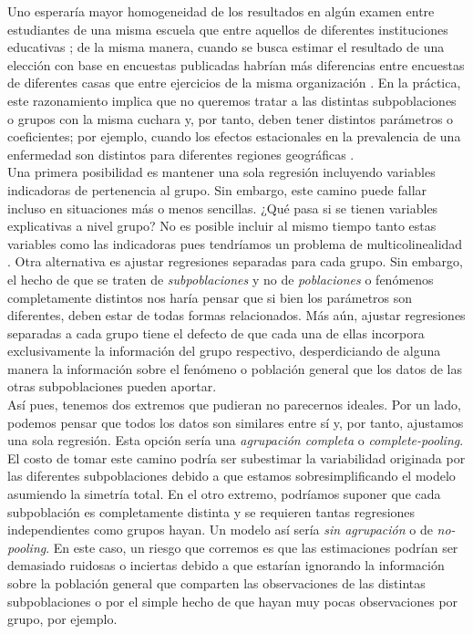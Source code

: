 Uno esperaría mayor homogeneidad de los resultados en algún examen entre estudiantes de una misma escuela que entre aquellos de diferentes instituciones educativas \parencite{Ortiz12}; de la misma manera, cuando se busca estimar el resultado de una elección con base en encuestas publicadas habrían más diferencias entre encuestas de diferentes casas que entre ejercicios de la misma organización \parencite{Zepeda18}. En la práctica, este razonamiento implica que no queremos tratar a las distintas subpoblaciones o grupos con la misma cuchara y, por tanto, deben tener distintos parámetros o coeficientes; por ejemplo, cuando los efectos estacionales en la prevalencia de una enfermedad son distintos para diferentes regiones geográficas \parencite{Usi14}.\\ 

Una primera posibilidad es mantener una sola regresión incluyendo variables indicadoras de pertenencia al grupo. Sin embargo, este camino puede fallar incluso en situaciones más o menos sencillas. ¿Qué pasa si se tienen variables explicativas a nivel grupo? No es posible incluir al mismo tiempo tanto estas variables como las indicadoras pues tendríamos un problema de multicolinealidad \parencite{GelmanHill06}. Otra alternativa es ajustar regresiones separadas para cada grupo. Sin embargo, el hecho de que se traten de \textit{subpoblaciones} y no de \textit{poblaciones} o fenómenos completamente distintos nos haría pensar que si bien los parámetros son diferentes, deben estar de todas formas relacionados. Más aún, ajustar regresiones separadas a cada grupo tiene el defecto de que cada una de ellas incorpora exclusivamente la información del grupo respectivo, desperdiciando de alguna manera la información sobre el fenómeno o población general que los datos de las otras subpoblaciones pueden aportar.\\

Así pues, tenemos dos extremos que pudieran no parecernos ideales. Por un lado, podemos pensar que todos los datos son similares entre sí y, por tanto, ajustamos una sola regresión. Esta opción sería una \textit{agrupación completa} o \textit{complete-pooling}. El costo de tomar este camino podría ser subestimar la variabilidad originada por las diferentes subpoblaciones debido a que estamos sobresimplificando el modelo asumiendo la simetría total. En el otro extremo, podríamos suponer que cada subpoblación es completamente distinta y se requieren tantas regresiones independientes como grupos hayan. Un modelo así sería \textit{sin agrupación} o de \textit{no-pooling}. En este caso, un riesgo que corremos es que las estimaciones podrían ser demasiado ruidosas o inciertas debido a que estarían ignorando la información sobre la población general que comparten las observaciones de las distintas subpoblaciones o por el simple hecho de que hayan muy pocas observaciones por grupo, por ejemplo.\\ 

